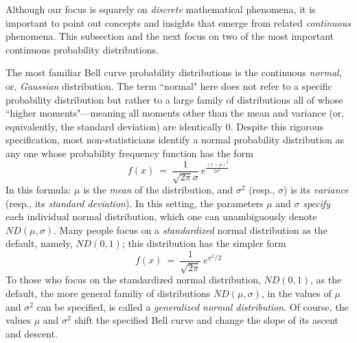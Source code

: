 Although our focus is squarely on {\em discrete} mathematical phenomena, it is important to point out concepts and insights that emerge from related {\em continuous} phenomena.  This subsection and the next focus on two of the most important continuous probability distributions.

\medskip

The most familiar Bell curve probability distributions is the continuous {\em normal}, or, {\it Gaussian} distribution.  The term ``normal" here does not refer to a specific probability distribution but rather to a large family of distributions all of whose ``higher moments"---meaning all moments other than the mean and variance (or, equivalently, the standard deviation) are identically $0$.  Despite this rigorous specification, most non-statisticians identify a normal probability distribution as any one whose probability frequency function has the form
\[ f(x) \ = \ \frac{1}{\sqrt{2 \pi} \sigma} \ e^{\frac{(x - \mu)^2}{2 \sigma^2} } \]
In this formula: $\mu$ is the {\it mean} of the distribution, and
$\sigma^2$ (resp., $\sigma$) is its {\it variance} (resp., its {\it
  standard deviation}).  In this setting, the parameters $\mu$ and
$\sigma$ {\em specify} each individual normal distribution, which one
can unambiguously denote $ND(\mu, \sigma)$.  Many people focus on a
{\em standardized} normal distribution as the default, namely,
$ND(0,1)$; this distribution has the simpler form
\[ f(x) \ = \ \frac{1}{\sqrt{2 \pi}} \ e^{x^2/2} \]
To those who focus on the standardized normal distribution, $ND(0,1)$, as the
default, the more general familiy of distributions $ND(\mu, \sigma)$,
in the values of $\mu$ and $\sigma^2$ can be specified, is called a {\em generalized normal distribution}.  Of course, the values $\mu$ and $\sigma^2$ shift the specified Bell curve and change the slope of its ascent and descent.

\bigskip

\noindent {}

\bigskip

